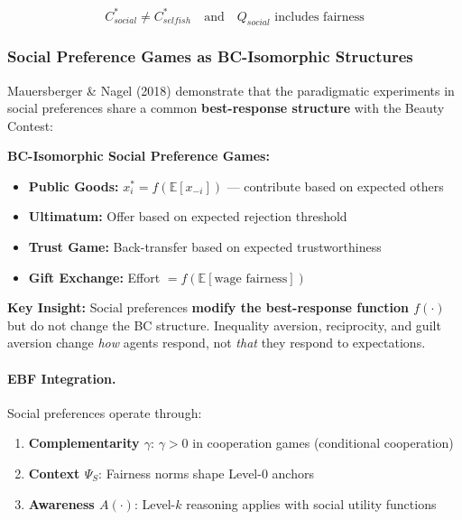\begin{equation}
\boxed{
C^*_{social} \neq C^*_{selfish} \quad \text{and} \quad Q_{social} \text{ includes fairness}
}
\end{equation}

\subsubsection{Social Preference Games as BC-Isomorphic Structures}

Mauersberger \& Nagel (2018) demonstrate that the paradigmatic experiments in social
preferences share a common \textbf{best-response structure} with the Beauty Contest:

\begin{tcolorbox}[colback=yellow!5!white, colframe=yellow!75!black,
    title=\textbf{M\&N (2018): Social Games in the BC Framework}]

\textbf{BC-Isomorphic Social Preference Games:}
\begin{itemize}[nosep]
    \item \textbf{Public Goods:} $x^*_i = f(\mathbb{E}[x_{-i}])$ --- contribute based on expected others
    \item \textbf{Ultimatum:} Offer based on expected rejection threshold
    \item \textbf{Trust Game:} Back-transfer based on expected trustworthiness
    \item \textbf{Gift Exchange:} Effort $= f(\mathbb{E}[\text{wage fairness}])$
\end{itemize}

\textbf{Key Insight:} Social preferences \textbf{modify the best-response function $f(\cdot)$}
but do not change the BC structure. Inequality aversion, reciprocity, and guilt aversion
change \textit{how} agents respond, not \textit{that} they respond to expectations.

\end{tcolorbox}

\paragraph{EBF Integration.}
Social preferences operate through:
\begin{enumerate}[nosep]
    \item \textbf{Complementarity $\gamma$}: $\gamma > 0$ in cooperation games (conditional cooperation)
    \item \textbf{Context $\Psi_S$}: Fairness norms shape Level-0 anchors
    \item \textbf{Awareness $A(\cdot)$}: Level-$k$ reasoning applies with social utility functions
\end{enumerate}

